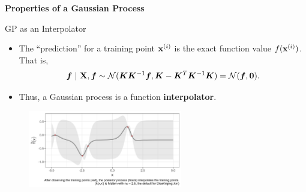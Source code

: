 \begin{frame}[c]{}
\centering
\huge
\textbf{Properties of a Gaussian Process}
\end{frame}
\begin{frame}[c]{GP as an Interpolator}

\begin{itemize}

\item The  ``prediction'' for a training point $\mathbf{x}^{(i)}$ is the exact function value $f(\mathbf{x}^{(i)})$. That is, 
\begin{eqnarray*}
\bm{f} ~|~ \mathbf{X}, \bm{f} \sim \mathcal{N}(\bm{K}\bm{K}^{-1}\bm{f}, \bm{K} - \bm{K}^T \bm{K}^{-1} \bm{K}) = \mathcal{N}(\bm{f}, \bm{0}).
\end{eqnarray*}

\item Thus, a Gaussian process is a function \textbf{interpolator}.
\end{itemize}

\begin{figure}
\includegraphics[width=0.6\textwidth]{figure_man/gp-interpolator.png}\par
\end{figure}

\end{frame}

